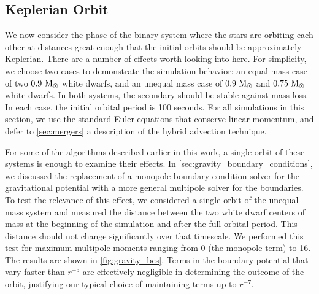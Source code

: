\documentclass[12pt]{article}
\begin{document}
\subsection{Keplerian Orbit}
\label{sec:kepler}

We now consider the phase of the binary system where the stars are orbiting each other
at distances great enough that the initial orbits should be approximately Keplerian.
There are a number of effects worth looking into here. For simplicity, we choose two
cases to demonstrate the simulation behavior: an equal mass case of two $0.9\ \mathrm{M}_\odot$
white dwarfs, and an unequal mass case of $0.9\ \mathrm{M}_\odot$ and $0.75\ \mathrm{M}_\odot$ white dwarfs.
In both systems, the secondary should be stable against mass loss.
In each case, the initial orbital period is 100 seconds. For all simulations in this section,
we use the standard Euler equations that conserve linear momentum, and defer to \autoref{sec:mergers}
a description of the hybrid advection technique.

For some of the algorithms described earlier in this work, a single orbit of these
systems is enough to examine their effects. In \autoref{sec:gravity_boundary_conditions},
we discussed the replacement of a monopole boundary condition solver for the gravitational
potential with a more general multipole solver for the boundaries. To test the relevance
of this effect, we considered a single orbit of the unequal mass system and measured
the distance between the two white dwarf centers of mass at the beginning of the simulation and after
the full orbital period. This distance should not change significantly over that timescale.
We performed this test for maximum multipole moments ranging from 0 (the monopole term) to 16.
The results are shown in \autoref{fig:gravity_bcs}. Terms in the boundary potential
that vary faster than $r^{-5}$ are effectively negligible in determining the outcome of the orbit,
justifying our typical choice of maintaining terms up to $r^{-7}$.
\end{document}

